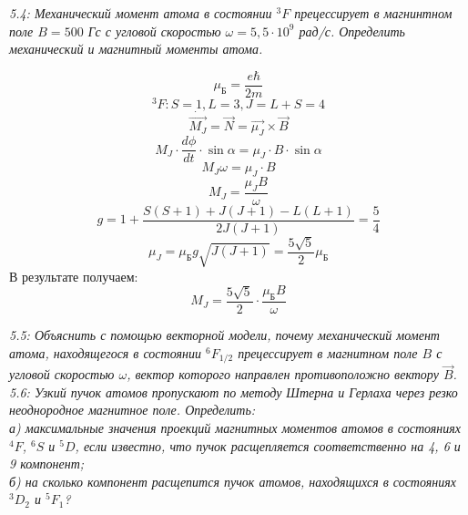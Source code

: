 	\emph{5.4: Механический момент атома в состоянии \( ^3F \)
        прецессирует в магнинтном поле \( B = 500 \) Гс с 
        угловой скоростью \( \omega = 5,5\cdot10^9 \) рад/с. 
        Определить механический и магнитный моменты атома.}
		
        \[ \mu_\text{Б} = \frac{e\hbar}{2m} \]
		\[ ^3F: S = 1, L = 3, J = L+S = 4 \]
		\[ \dot{\vec{M_J}} = \vec{N} = \vec{\mu_J}\times\vec{B} \]
		\[ 
            M_J\cdot\frac{d\phi}{dt}\cdot\sin\alpha = 
            \mu_J\cdot B\cdot\sin\alpha 
        \]
		\[ M_J\omega = \mu_J\cdot B \]
		\[ M_J = \frac{\mu_JB}{\omega} \]
		\[ g = 1 + \frac{S(S+1)+J(J+1)-L(L+1)}{2J(J+1)} = \frac{5}{4} \]
		\[ 
            \mu_J = \mu_\text{Б}g\sqrt{J(J+1)} 
            = \frac{5\sqrt{5}}{2}\mu_\text{Б} 
        \]
		В результате получаем:
		\[ M_J = \frac{5\sqrt{5}}{2}\cdot\frac{\mu_\text{Б}B}{\omega} \]

	\emph{5.5: Объяснить с помощью векторной модели, почему механический момент
        атома, находящегося в состоянии \( ^6F_{1/2} \) прецессирует в магнитном 
        поле \( B \) с угловой скоростью \( \omega \), вектор которого направлен 
        противоположно вектору \( \vec{B} \).} \\

	\emph{5.6: Узкий пучок атомов пропускают по методу Штерна и 
        Герлаха через резко неоднородное магнитное поле. Определить:\\ 
        а) максимальные значения проекций магнитных моментов атомов 
        в состояниях \( ^4F \), \( ^6S \) и \( ^5D \), если известно, 
        что пучок расщепляется соответственно на 4, 6 и 9 компонент;\\
        б) на сколько компонент расщепится пучок атомов, 
        находящихся в состояниях \( ^3D_2 \) и \( ^5F_1 \)?}

